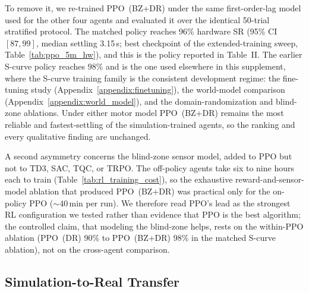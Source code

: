 To remove it, we re-trained PPO~(BZ+DR) under the same first-order-lag
model used for the other four agents and evaluated it over the identical
50-trial stratified protocol. The matched policy reaches 96\% hardware SR
(95\% CI $[87, 99]$, median settling 3.15\,s; best checkpoint of the
extended-training sweep, Table~\ref{tab:ppo_5m_hw}), and this is the
policy reported in Table~II. The earlier S-curve policy reaches 98\% and is
the one used elsewhere in this supplement, where the S-curve training
family is the consistent development regime: the fine-tuning study
(Appendix~\ref{appendix:finetuning}), the world-model comparison
(Appendix~\ref{appendix:world_model}), and the domain-randomization and
blind-zone ablations. Under either motor model PPO~(BZ+DR) remains the
most reliable and fastest-settling of the simulation-trained agents, so
the ranking and every qualitative finding are unchanged.

A second asymmetry concerns the blind-zone sensor model, added to PPO but
not to TD3, SAC, TQC, or TRPO. The off-policy agents take six to nine
hours each to train (Table~\ref{tab:rl_training_cost}), so the exhaustive
reward-and-sensor-model ablation that produced PPO~(BZ+DR) was practical
only for the on-policy PPO ($\sim$40\,min per run). We therefore read
PPO's lead as the strongest RL configuration we tested rather than
evidence that PPO is the best algorithm; the controlled claim, that
modeling the blind-zone helps, rests on the within-PPO ablation
(PPO~(DR) 90\% to PPO~(BZ+DR) 98\% in the matched S-curve ablation),
not on the cross-agent comparison.

\subsection{Simulation-to-Real Transfer}
\label{appendix:sim2real}

